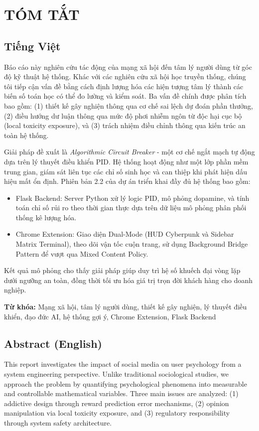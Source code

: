 \section*{TÓM TẮT}

\subsection*{Tiếng Việt}
Báo cáo này nghiên cứu tác động của mạng xã hội đến tâm lý người dùng từ góc độ kỹ thuật hệ thống. Khác với các nghiên cứu xã hội học truyền thống, chúng tôi tiếp cận vấn đề bằng cách định lượng hóa các hiện tượng tâm lý thành các biến số toán học có thể đo lường và kiểm soát. Ba vấn đề chính được phân tích bao gồm: (1) thiết kế gây nghiện thông qua cơ chế sai lệch dự đoán phần thưởng, (2) điều hướng dư luận thông qua mức độ phơi nhiễm ngôn từ độc hại cục bộ (local toxicity exposure), và (3) trách nhiệm điều chỉnh thông qua kiến trúc an toàn hệ thống.

Giải pháp đề xuất là \textit{Algorithmic Circuit Breaker} - một cơ chế ngắt mạch tự động dựa trên lý thuyết điều khiển PID. Hệ thống hoạt động như một lớp phần mềm trung gian, giám sát liên tục các chỉ số sinh học và can thiệp khi phát hiện dấu hiệu mất ổn định. Phiên bản 2.2 của dự án triển khai đầy đủ hệ thống bao gồm:
\begin{itemize}
    \item Flask Backend: Server Python xử lý logic PID, mô phỏng dopamine, và tính toán chỉ số rủi ro theo thời gian thực dựa trên dữ liệu mô phỏng phân phối thống kê lượng hóa.
    \item Chrome Extension: Giao diện Dual-Mode (HUD Cyberpunk và Sidebar Matrix Terminal), theo dõi vận tốc cuộn trang, sử dụng Background Bridge Pattern để vượt qua Mixed Content Policy.
\end{itemize}

Kết quả mô phỏng cho thấy giải pháp giúp duy trì hệ số khuếch đại vòng lặp dưới ngưỡng an toàn, đồng thời tối ưu hóa giá trị trọn đời khách hàng cho doanh nghiệp.

\textbf{Từ khóa:} Mạng xã hội, tâm lý người dùng, thiết kế gây nghiện, lý thuyết điều khiển, đạo đức AI, hệ thống gợi ý, Chrome Extension, Flask Backend

\subsection*{Abstract (English)}
This report investigates the impact of social media on user psychology from a system engineering perspective. Unlike traditional sociological studies, we approach the problem by quantifying psychological phenomena into measurable and controllable mathematical variables. Three main issues are analyzed: (1) addictive design through reward prediction error mechanisms, (2) opinion manipulation via local toxicity exposure, and (3) regulatory responsibility through system safety architecture.

